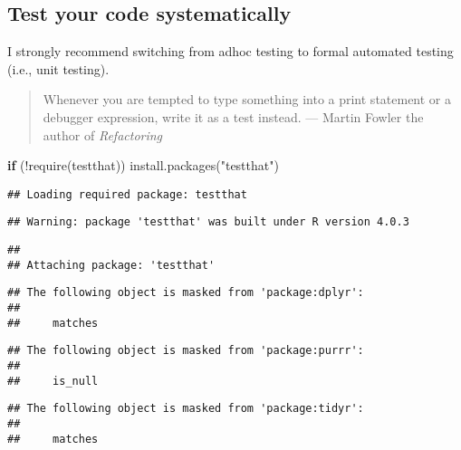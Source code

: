 \documentclass[
]{book}
\newenvironment{Shaded}{\begin{snugshade}}{\end{snugshade}}
\newcommand{\ControlFlowTok}[1]{\textcolor[rgb]{0.13,0.29,0.53}{\textbf{#1}}}
\newcommand{\FunctionTok}[1]{\textcolor[rgb]{0.00,0.00,0.00}{#1}}
\newcommand{\NormalTok}[1]{#1}
\newcommand{\SpecialCharTok}[1]{\textcolor[rgb]{0.00,0.00,0.00}{#1}}
\newcommand{\StringTok}[1]{\textcolor[rgb]{0.31,0.60,0.02}{#1}}
\begin{document}
\hypertarget{test-your-code-systematically}{%
\subsection{Test your code systematically}\label{test-your-code-systematically}}

I strongly recommend switching from adhoc testing to formal automated testing (i.e., unit testing).

\begin{quote}
Whenever you are tempted to type something into a print statement or a debugger expression, write it as a test instead. --- Martin Fowler the author of \emph{Refactoring}
\end{quote}

\begin{Shaded}
\begin{Highlighting}[]
\ControlFlowTok{if}\NormalTok{ (}\SpecialCharTok{!}\FunctionTok{require}\NormalTok{(testthat)) }\FunctionTok{install.packages}\NormalTok{(}\StringTok{"testthat"}\NormalTok{)}
\end{Highlighting}
\end{Shaded}

\begin{verbatim}
## Loading required package: testthat
\end{verbatim}

\begin{verbatim}
## Warning: package 'testthat' was built under R version 4.0.3
\end{verbatim}

\begin{verbatim}
## 
## Attaching package: 'testthat'
\end{verbatim}

\begin{verbatim}
## The following object is masked from 'package:dplyr':
## 
##     matches
\end{verbatim}

\begin{verbatim}
## The following object is masked from 'package:purrr':
## 
##     is_null
\end{verbatim}

\begin{verbatim}
## The following object is masked from 'package:tidyr':
## 
##     matches
\end{verbatim}
\end{document}
